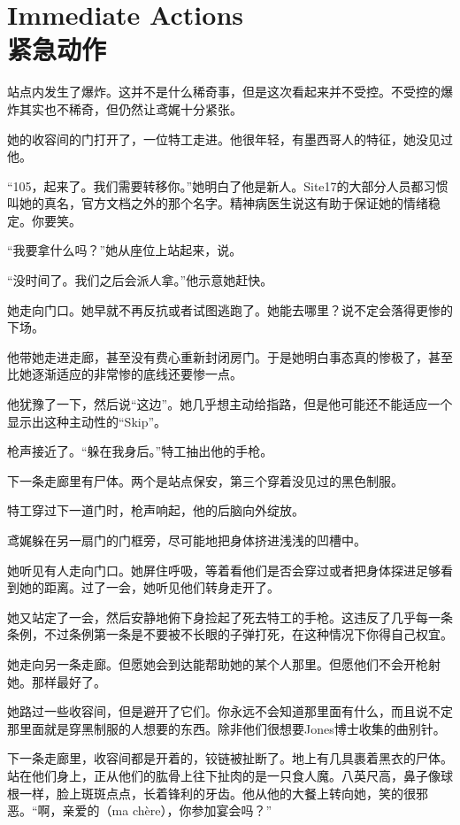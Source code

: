 \chapter[紧急动作]{
    Immediate Actions\\
    紧急动作
}

\label{chap:TALE-immediate-actions}

站点内发生了爆炸。这并不是什么稀奇事，但是这次看起来并不受控。不受控的爆炸其实也不稀奇，但仍然让鸢娓十分紧张。

她的收容间的门打开了，一位特工走进。他很年轻，有墨西哥人的特征，她没见过他。

“105，起来了。我们需要转移你。”她明白了他是新人。Site17的大部分人员都习惯叫她的真名，官方文档之外的那个名字。精神病医生说这有助于保证她的情绪稳定。你要笑。

“我要拿什么吗？”她从座位上站起来，说。

“没时间了。我们之后会派人拿。”他示意她赶快。

她走向门口。她早就不再反抗或者试图逃跑了。她能去哪里？说不定会落得更惨的下场。

他带她走进走廊，甚至没有费心重新封闭房门。于是她明白事态真的惨极了，甚至比她逐渐适应的非常惨的底线还要惨一点。

他犹豫了一下，然后说“这边”。她几乎想主动给指路，但是他可能还不能适应一个显示出这种主动性的“Skip”。

枪声接近了。“躲在我身后。”特工抽出他的手枪。

下一条走廊里有尸体。两个是站点保安，第三个穿着没见过的黑色制服。

特工穿过下一道门时，枪声响起，他的后脑向外绽放。

鸢娓躲在另一扇门的门框旁，尽可能地把身体挤进浅浅的凹槽中。

她听见有人走向门口。她屏住呼吸，等着看他们是否会穿过或者把身体探进足够看到她的距离。过了一会，她听见他们转身走开了。

她又站定了一会，然后安静地俯下身捡起了死去特工的手枪。这违反了几乎每一条条例，不过条例第一条是不要被不长眼的子弹打死，在这种情况下你得自己权宜。

她走向另一条走廊。但愿她会到达能帮助她的某个人那里。但愿他们不会开枪射她。那样最好了。

她路过一些收容间，但是避开了它们。你永远不会知道那里面有什么，而且说不定那里面就是穿黑制服的人想要的东西。除非他们很想要Jones博士收集的曲别针。

下一条走廊里，收容间都是开着的，铰链被扯断了。地上有几具裹着黑衣的尸体。站在他们身上，正从他们的肱骨上往下扯肉的是一只食人魔。八英尺高，鼻子像球根一样，脸上斑斑点点，长着锋利的牙齿。他从他的大餐上转向她，笑的很邪恶。“啊，亲爱的（ma chère），你参加宴会吗？”

